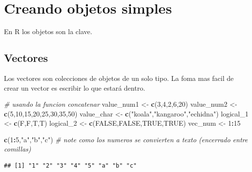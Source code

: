 \documentclass[
]{book}
\newenvironment{Shaded}{\begin{snugshade}}{\end{snugshade}}
\newcommand{\CommentTok}[1]{\textcolor[rgb]{0.56,0.35,0.01}{\textit{#1}}}
\newcommand{\DecValTok}[1]{\textcolor[rgb]{0.00,0.00,0.81}{#1}}
\newcommand{\KeywordTok}[1]{\textcolor[rgb]{0.13,0.29,0.53}{\textbf{#1}}}
\newcommand{\NormalTok}[1]{#1}
\newcommand{\OperatorTok}[1]{\textcolor[rgb]{0.81,0.36,0.00}{\textbf{#1}}}
\newcommand{\OtherTok}[1]{\textcolor[rgb]{0.56,0.35,0.01}{#1}}
\newcommand{\StringTok}[1]{\textcolor[rgb]{0.31,0.60,0.02}{#1}}
\begin{document}
\hypertarget{creando-objetos-simples}{%
\chapter{Creando objetos simples}\label{creando-objetos-simples}}

En R los objetos son la clave.

\hypertarget{vectores}{%
\section{Vectores}\label{vectores}}

Los vectores son colecciones de objetos de un solo tipo. La foma mas facil de crear un vector es escribir lo que estará dentro.

\begin{Shaded}
\begin{Highlighting}[]
\CommentTok{# usando la funcion concatenar}
\NormalTok{value_num1 <-}\StringTok{ }\KeywordTok{c}\NormalTok{(}\DecValTok{3}\NormalTok{,}\DecValTok{4}\NormalTok{,}\DecValTok{2}\NormalTok{,}\DecValTok{6}\NormalTok{,}\DecValTok{20}\NormalTok{)}
\NormalTok{value_num2 <-}\StringTok{ }\KeywordTok{c}\NormalTok{(}\DecValTok{5}\NormalTok{,}\DecValTok{10}\NormalTok{,}\DecValTok{15}\NormalTok{,}\DecValTok{20}\NormalTok{,}\DecValTok{25}\NormalTok{,}\DecValTok{30}\NormalTok{,}\DecValTok{35}\NormalTok{,}\DecValTok{50}\NormalTok{)}
\NormalTok{value_char <-}\StringTok{ }\KeywordTok{c}\NormalTok{(}\StringTok{"koala"}\NormalTok{,}\StringTok{"kangaroo"}\NormalTok{,}\StringTok{"echidna"}\NormalTok{)}
\NormalTok{logical_}\DecValTok{1}\NormalTok{ <-}\StringTok{ }\KeywordTok{c}\NormalTok{(F,F,T,T)}
\NormalTok{logical_}\DecValTok{2}\NormalTok{ <-}\StringTok{ }\KeywordTok{c}\NormalTok{(}\OtherTok{FALSE}\NormalTok{,}\OtherTok{FALSE}\NormalTok{,}\OtherTok{TRUE}\NormalTok{,}\OtherTok{TRUE}\NormalTok{)}
\NormalTok{vec_num <-}\StringTok{ }\DecValTok{1}\OperatorTok{:}\DecValTok{15}

\KeywordTok{c}\NormalTok{(}\DecValTok{1}\OperatorTok{:}\DecValTok{5}\NormalTok{,}\StringTok{"a"}\NormalTok{,}\StringTok{"b"}\NormalTok{,}\StringTok{"c"}\NormalTok{) }\CommentTok{# note como los numeros se convierten a texto (encerrado entre comillas)}
\end{Highlighting}
\end{Shaded}

\begin{verbatim}
## [1] "1" "2" "3" "4" "5" "a" "b" "c"
\end{verbatim}
\end{document}
